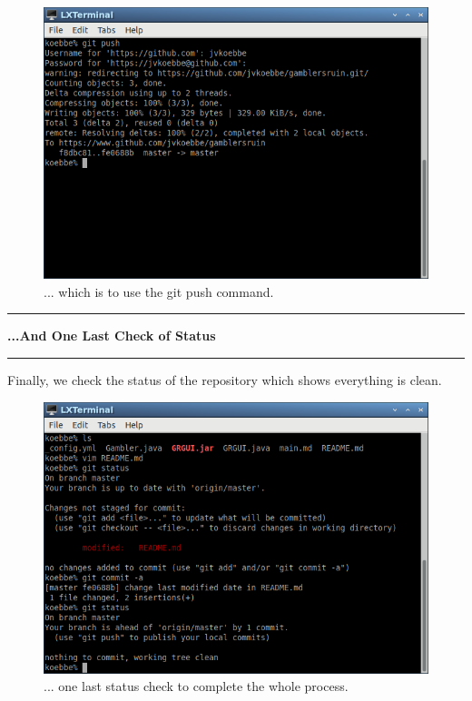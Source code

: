 \documentclass[10pt,fleqn]{article}
\begin{document}
\vfill
\begin{figure}[h]
\centering
\includegraphics[width=5.0in]{../images/git_16.png}
\caption{... which is to use the git push command.}
\end{figure}
\eject
\eject
\vskip0.1in\hrule\vskip0.1in\noindent
{\bf ...And One Last Check of Status} 
\vskip0.1in\hrule\vskip0.1in\noindent
Finally, we check the status of the repository which shows everything is clean.
\vfill
\begin{figure}[h]
\centering
\includegraphics[width=5.0in]{../images/git_15.png}
\caption{... one last status check to complete the whole process. }
\end{figure}
\end{document}
